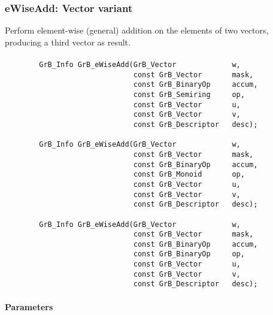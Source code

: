 \subsubsection{{\sf eWiseAdd}: Vector variant}

Perform element-wise (general) addition on the elements of two vectors,
producing a third vector as result.

\paragraph{\syntax}

\begin{verbatim}
        GrB_Info GrB_eWiseAdd(GrB_Vector             w,
                              const GrB_Vector       mask,
                              const GrB_BinaryOp     accum,
                              const GrB_Semiring     op,
                              const GrB_Vector       u,
                              const GrB_Vector       v,
                              const GrB_Descriptor   desc);
                            
        GrB_Info GrB_eWiseAdd(GrB_Vector             w,
                              const GrB_Vector       mask,
                              const GrB_BinaryOp     accum,
                              const GrB_Monoid       op,
                              const GrB_Vector       u,
                              const GrB_Vector       v,
                              const GrB_Descriptor   desc);

        GrB_Info GrB_eWiseAdd(GrB_Vector             w,
                              const GrB_Vector       mask,
                              const GrB_BinaryOp     accum,
                              const GrB_BinaryOp     op,
                              const GrB_Vector       u,
                              const GrB_Vector       v,
                              const GrB_Descriptor   desc);
\end{verbatim}

\paragraph{Parameters}

